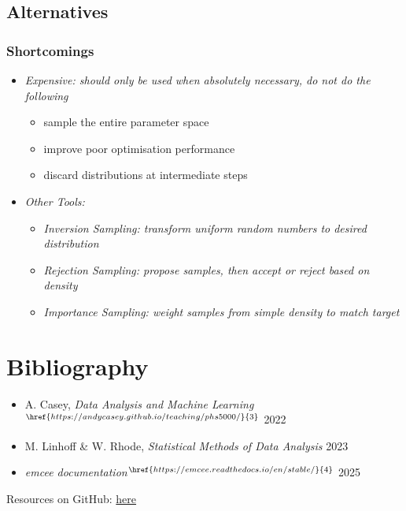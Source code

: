 	\subsection{Alternatives}

	\begin{frame}
		\frametitle{Shortcomings}
		\begin{itemize}
			\item<2-> \itshape{Expensive:} should only be used when absolutely necessary, do not do the following
			\begin{itemize}
				\item<3-> sample the entire parameter space
				\item<4-> improve poor optimisation performance
				\item<5-> discard distributions at intermediate steps
			\end{itemize}
			\item<6-> \itshape{Other Tools:}
			\begin{itemize}
				\item<7-> \itshape{Inversion Sampling:} transform uniform random numbers to desired distribution
				\item<8-> \itshape{Rejection Sampling:} propose samples, then accept or reject based on density
				\item<9-> \itshape{Importance Sampling:} weight samples from simple density to match target
			\end{itemize}
		\end{itemize}
	\end{frame}

	\section{Bibliography}

	\begin{frame}
		\begin{center}\textcolor{MASS}{}\end{center}\vspace{2ex}
		\begin{itemize}
			\item A. Casey, {\itshape{Data Analysis and Machine Learning}}$^{\href{https://andycasey.github.io/teaching/phs5000/}{3}}$ 2022
			\item M. Linhoff \& W. Rhode, {\itshape{Statistical Methods of Data Analysis}} 2023
			\item {\itshape{emcee documentation}}$^{\href{https://emcee.readthedocs.io/en/stable/}{4}}$ 2025
		\end{itemize}
		\vspace{2ex}
		Resources on GitHub: \href{https://github.com/fritzali/notes/tree/main/MASS/Numerical/talk}{here}
	\end{frame}

